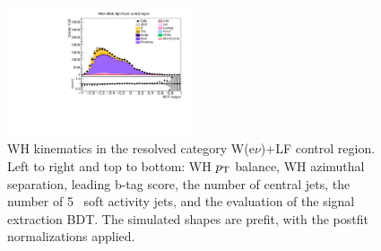 \begin{figure}[tbp]
\begin{center}
    \includegraphics[width=0.48\textwidth]{figures/wlnhbb2016/resolved/WenWHLightFlavorCR_bdtValue.pdf}
    \caption{WH kinematics in the resolved category W(e$\nu$)+LF control region.
    Left to right and top to bottom: WH $p_{\mathrm{T}}$ balance, WH azimuthal separation, leading b-tag score, the number of central jets,
    the number of 5 \GeV\ soft activity jets, and the evaluation of the signal extraction BDT.
    The simulated shapes are prefit, with the postfit normalizations applied.}
    \label{fig:res_WenLF_WH}
  \end{center}
\end{figure}
\clearpage



